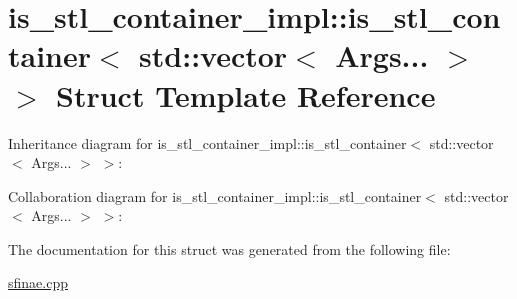 \hypertarget{structis__stl__container__impl_1_1is__stl__container_3_01std_1_1vector_3_01Args_8_8_8_01_4_01_4}{}\section{is\+\_\+stl\+\_\+container\+\_\+impl\+:\+:is\+\_\+stl\+\_\+container$<$ std\+:\+:vector$<$ Args... $>$ $>$ Struct Template Reference}
\label{structis__stl__container__impl_1_1is__stl__container_3_01std_1_1vector_3_01Args_8_8_8_01_4_01_4}


Inheritance diagram for is\+\_\+stl\+\_\+container\+\_\+impl\+:\+:is\+\_\+stl\+\_\+container$<$ std\+:\+:vector$<$ Args... $>$ $>$\+:


Collaboration diagram for is\+\_\+stl\+\_\+container\+\_\+impl\+:\+:is\+\_\+stl\+\_\+container$<$ std\+:\+:vector$<$ Args... $>$ $>$\+:


The documentation for this struct was generated from the following file\+:\begin{DoxyCompactItemize}
\item 
\hyperlink{sfinae_8cpp}{sfinae.\+cpp}\end{DoxyCompactItemize}
